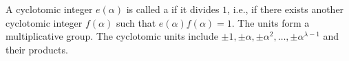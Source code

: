 A cyclotomic integer $e(\alpha)$ is called a  if it divides $1$, i.e., if there exists another cyclotomic integer $f(\alpha)$ such that $e(\alpha)f(\alpha) = 1$. The units form a multiplicative group. The cyclotomic units include $\pm 1, \pm \alpha, \pm \alpha^2, \ldots, \pm \alpha^{\lambda-1}$ and their products.
